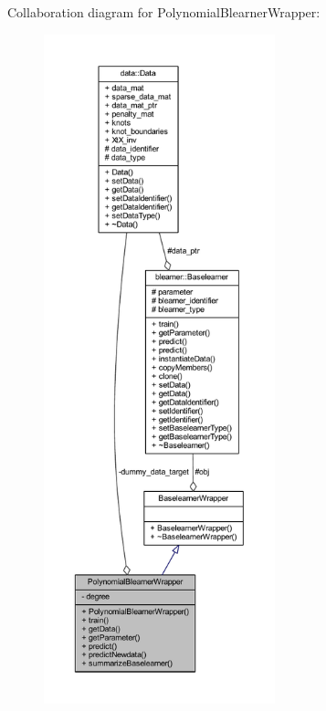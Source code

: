 Collaboration diagram for Polynomial\+Blearner\+Wrapper\+:
\nopagebreak
\begin{figure}[H]
\begin{center}
\leavevmode
\includegraphics[height=550pt]{class_polynomial_blearner_wrapper__coll__graph}
\end{center}
\end{figure}
